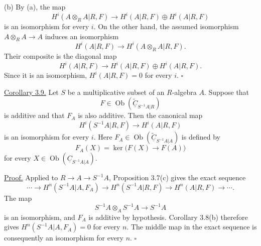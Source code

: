 (b) By (a), the map
\[
 H^i(A\otimes_RA|R,F)
 \longrightarrow H^i(A|R,F)\oplus H^i(A|R,F)
\]
is an isomorphism for every $i$. On the other hand, the assumed
isomorphism $A\otimes_RA\longrightarrow A$ induces an isomorphism
\[
 H^i(A|R,F)\longrightarrow H^i(A\otimes_RA|R,F).
\]
Their composite is the diagonal map
\[
 H^i(A|R,F)\longrightarrow
 H^i(A|R,F)\oplus H^i(A|R,F).
\]
Since it is an isomorphism, $H^i(A|R,F)=0$ for every $i$.
\hfill$\square$

\underline{Corollary 3.9.} Let $S$ be a multiplicative subset of
an $R$-algebra $A$. Suppose that
\[
 F\in\operatorname{Ob}
 (\widetilde{\underline C}_{S^{-1}A|R})
\]
is additive and that $F_A$ is also additive. Then the canonical map
\[
 H^i(S^{-1}A|R,F)\longrightarrow H^i(A|R,F)
\]
is an isomorphism for every $i$. Here
$F_A\in\operatorname{Ob}
(\widetilde{\underline C}_{S^{-1}A|A})$ is defined by
\[
 F_A(X)=\ker\bigl(F(X)\longrightarrow F(A)\bigr)
\]
for every
$X\in\operatorname{Ob}(\underline C_{S^{-1}A|A})$.

\underline{Proof.} Applied to
$R\longrightarrow A\longrightarrow S^{-1}A$, Proposition 3.7(c)
gives the exact sequence
\[
 \cdots\longrightarrow H^n(S^{-1}A|A,F_A)
 \longrightarrow H^n(S^{-1}A|R,F)
 \longrightarrow H^n(A|R,F)\longrightarrow\cdots.
\]
The map
\[
 S^{-1}A\otimes_AS^{-1}A\longrightarrow S^{-1}A
\]
is an isomorphism, and $F_A$ is additive by hypothesis. Corollary
3.8(b) therefore gives
$H^n(S^{-1}A|A,F_A)=0$ for every $n$. The middle map in the exact
sequence is consequently an isomorphism for every $n$.
\hfill$\square$
